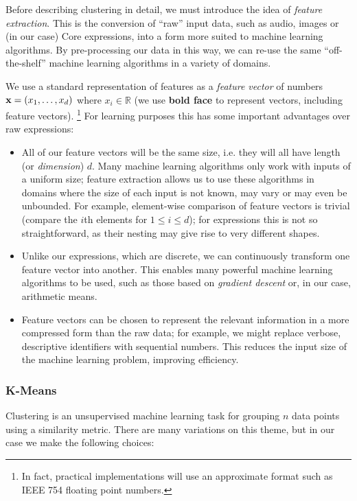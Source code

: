 Before describing clustering in detail, we must introduce the idea of \emph{feature extraction}. This is the conversion of ``raw'' input data, such as audio, images or (in our case) Core expressions, into a form more suited to machine learning algorithms. By pre-processing our data in this way, we can re-use the same ``off-the-shelf'' machine learning algorithms in a variety of domains.

We use a standard representation of features as a \emph{feature vector} of numbers $\mathbf{x} = (x_1, \dots, x_d)$ where $x_i \in \mathbb{R}$ (we use \textbf{bold face} to represent vectors, including feature vectors). \footnote{In fact, practical implementations will use an approximate format such as IEEE 754 floating point numbers.} For learning purposes this has some important advantages over raw expressions:

\begin{itemize}
  \item All of our feature vectors will be the same size, i.e. they will all have length (or \emph{dimension}) $d$. Many machine learning algorithms only work with inputs of a uniform size; feature extraction allows us to use these algorithms in domains where the size of each input is not known, may vary or may even be unbounded. For example, element-wise comparison of feature vectors is trivial (compare the $i$th elements for $1 \leq i \leq d$); for expressions this is not so straightforward, as their nesting may give rise to very different shapes.
  \item Unlike our expressions, which are discrete, we can continuously transform one feature vector into another. This enables many powerful machine learning algorithms to be used, such as those based on \emph{gradient descent} or, in our case, arithmetic means.
  \item Feature vectors can be chosen to represent the relevant information in a more compressed form than the raw data; for example, we might replace verbose, descriptive identifiers with sequential numbers. This reduces the input size of the machine learning problem, improving efficiency.
\end{itemize}

\subsubsection{K-Means}
\label{sec:kmeans}

Clustering is an unsupervised machine learning task for grouping $n$ data points using a similarity metric. There are many variations on this theme, but in our case we make the following choices:

